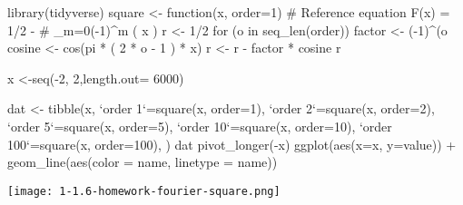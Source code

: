 \documentclass[../main/main.tex]{subfiles}
\begin{document}
\pagebreak
\begin{center}

	\begin{rcode}
		library(tidyverse)
		square <- function(x, order=1) {
				#  Reference equation F(x) = 1/2 -
				#    \sum_{m=0}(-1)^{m} \cos( x )
				r <- 1/2
				for (o in seq_len(order)) {
						factor <- (-1)^(o %
						cosine <- cos(pi * ( 2 * o - 1 ) * x)
						r <- r - factor * cosine
					}
				r
			}

		x <-seq(-2, 2,length.out= 6000)

		dat <- tibble(x,
		`order 1`=square(x, order=1),
		`order 2`=square(x, order=2),
		`order 5`=square(x, order=5),
		`order 10`=square(x, order=10),
		`order 100`=square(x, order=100),
		)
		dat %
		pivot_longer(-x) %
		ggplot(aes(x=x, y=value)) +
		geom_line(aes(color = name, linetype = name))
	\end{rcode}
	\texttt{[image: 1-1.6-homework-fourier-square.png]}
\end{center}
\end{document}
